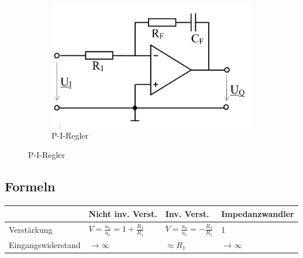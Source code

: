 \clearpage
	\begin{figure}[h]
		\begin{subfigure}{0.25\textwidth}
		\includegraphics[width=\textwidth]{images/pi-regler}
		\caption{P-I-Regler}
		\end{subfigure}
	\end{figure}


	\subsection{Formeln}
		\begin{table}[h]
		\begin{tabularx}{\textwidth}{XXXX}
		& Nicht inv. Verst. & Inv. Verst. & Impedanzwandler\\
		\toprule
		Verstärkung & $V=\frac{u_{\mathrm{a}}}{u_{\mathrm{e}}}=1+\frac{R_2}{R_1}$ & $V=\frac{u_{\mathrm{a}}}{u_{\mathrm{e}}}=-\frac{R_2}{R_1}$ &1\\
		\midrule
		Eingangswiderstand & $\rightarrow \infty$ & $\approx R_1$ & $\rightarrow \infty$\\
		\bottomrule
		\end{tabularx}
		\end{table}
		
